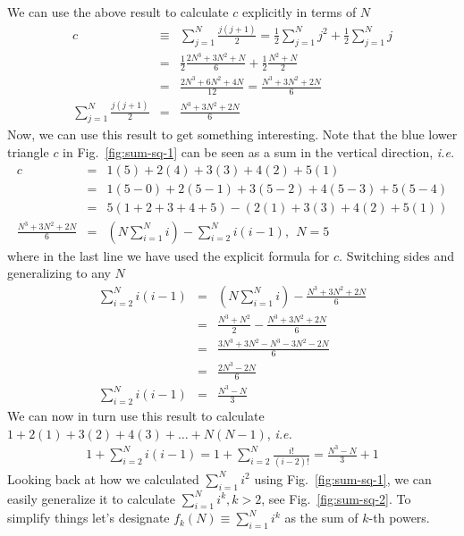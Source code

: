 \documentclass[aps,preprint,preprintnumbers,nofootinbib,showpacs,prd]{revtex4-1}
\newcommand{\ie}{{\it i.e.} }
\newcommand{\nbea}{\begin{eqnarray*}}
\newcommand{\neea}{\end{eqnarray*}}
\begin{document}
We can use the above result to calculate $c$ explicitly in terms of $N$
%
\nbea
c & \equiv & \sum^{N}_{j=1} \frac{j(j+1)}{2} = \frac{1}{2} \sum^{N}_{j=1} j^2 + \frac{1}{2} \sum^{N}_{j=1} j \\
& = & \frac{1}{2} \frac{2N^3 + 3N^2 + N}{6} + \frac{1}{2}\frac{N^2 + N}{2} \\
& = & \frac{2N^3 + 6N^2 + 4N}{12} = \frac{N^3 + 3N^2 + 2N}{6} \\
\sum^{N}_{j=1} \frac{j(j+1)}{2} & = & \frac{N^3 + 3N^2 + 2N}{6}
\neea
%
Now, we can use this result to get something interesting. Note that the blue lower triangle $c$ in Fig.~\ref{fig:sum-sq-1} can be seen as a sum in the vertical direction, \ie
%
\nbea
c & = & 1(5) + 2(4) + 3(3) + 4(2) + 5(1) \\
& = & 1(5 - 0) + 2(5 - 1) + 3(5 - 2) + 4(5 - 3) + 5(5 - 4) \\
& = & 5 (1 + 2 + 3 + 4 + 5) - (2(1) + 3(3) + 4(2) + 5(1)) \\
\frac{N^3 + 3N^2 + 2N}{6} & = & \left ( N\sum_{i=1}^{N} i \right ) - \sum_{i=2}^{N} i(i-1), ~~N=5
\neea
%
where in the last line we have used the explicit formula for $c$. Switching sides and generalizing to any $N$
%
\nbea
\sum_{i=2}^{N} i(i-1) & = & \left ( N\sum_{i=1}^{N} i \right ) - \frac{N^3 + 3N^2 + 2N}{6} \\
& = & \frac{N^3 + N^2}{2} - \frac{N^3 + 3N^2 + 2N}{6} \\
& = & \frac{3N^3 + 3N^2 - N^3 - 3N^2 - 2N}{6} \\
& = & \frac{2N^3 - 2N}{6} \\
\sum_{i=2}^{N} i(i-1) & = & \frac{N^3 - N}{3}
\neea
%
We can now in turn use this result to calculate $1 + 2(1) + 3(2) + 4(3) + \dots + N(N-1)$, \ie
%
\nbea
1 + \sum_{i=2}^{N} i(i-1) = 1 + \sum_{i=2}^{N} \frac{i!}{(i-2)!} = \frac{N^3 - N}{3} + 1
\neea
%
Looking back at how we calculated $\sum_{i=1}^{N} i^2$ using Fig.~\ref{fig:sum-sq-1}, we can easily generalize it to calculate $\sum_{i=1}^{N} i^k, k > 2$, see Fig.~\ref{fig:sum-sq-2}. To simplify things let's designate $f_k(N) \equiv \sum_{i=1}^{N} i^k$ as the sum of $k$-th powers.
%
\end{document}
